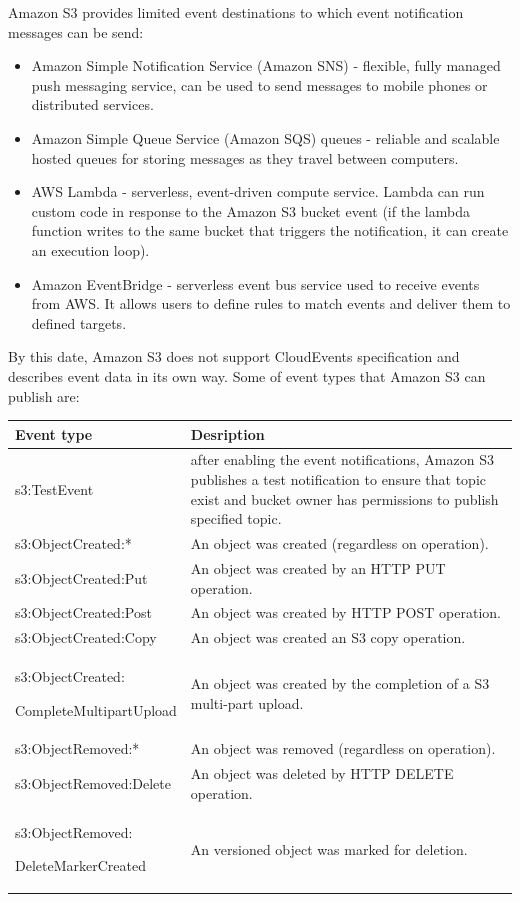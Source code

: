     Amazon S3 provides limited event destinations to which event notification messages can be send\cite{eventS3EventNotificationDest}:
    \begin{itemize}
        \item Amazon Simple Notification Service (Amazon SNS) - flexible, fully managed push messaging service, can be used to send messages to mobile phones or distributed services.
        \item Amazon Simple Queue Service (Amazon SQS) queues - reliable and scalable hosted queues for storing messages as they travel between computers.
        \item AWS Lambda - serverless, event-driven compute service. Lambda can run custom code in response to the Amazon S3 bucket event (if the lambda function writes to the same bucket that triggers the notification, it can create an execution loop).
        \item Amazon EventBridge - serverless event bus service used to receive events from AWS. It allows users to define rules to match events and deliver them to defined targets.
    \end{itemize}

    By this date, Amazon S3 does not support CloudEvents specification and describes event data in its own way. Some of event types that Amazon S3 can publish are\cite{eventS3EventNotificationDest}:


     \renewcommand*{\arraystretch}{1.4}
     \begin{tabularx}{\textwidth}{|p{}|X|}
         \hline
         \textbf{Event type} & \textbf{Desription} \\
         \hline
         s3:TestEvent & after enabling the event notifications, Amazon S3 publishes a test notification to ensure that topic exist and bucket owner has permissions to publish specified topic. \\
         \hline
         s3:ObjectCreated:* & An object was created (regardless on operation). \\
         \hline
         s3:ObjectCreated:Put & An object was created by an HTTP PUT operation. \\
         \hline
         s3:ObjectCreated:Post & An object was created by HTTP POST operation. \\
         \hline
         s3:ObjectCreated:Copy & An object was created an S3 copy operation. \\
         \hline
         s3:ObjectCreated:

         CompleteMultipartUpload & An object was created by the completion of a S3 multi-part upload. \\
         \hline
         s3:ObjectRemoved:* & An object was removed (regardless on operation). \\
         \hline
         s3:ObjectRemoved:Delete & An object was deleted by HTTP DELETE operation. \\
         \hline
         s3:ObjectRemoved:

         DeleteMarkerCreated & An versioned object was marked for deletion. \\
         \hline
    \end{tabularx}


